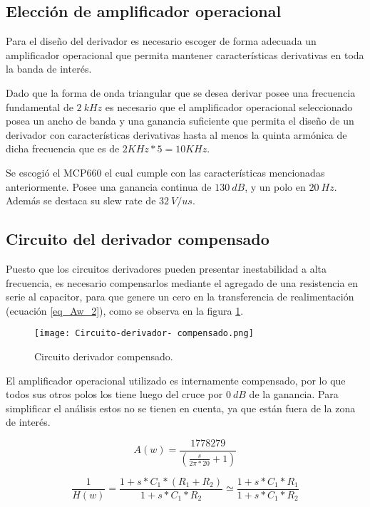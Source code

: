 \subsection{Elección de amplificador operacional}

Para el diseño del derivador es necesario escoger de forma adecuada un amplificador operacional que permita mantener características derivativas en toda la banda de interés.

Dado que la forma de onda triangular que se desea derivar posee una frecuencia fundamental de $2 \:kHz$ es necesario que el amplificador operacional seleccionado posea un ancho de banda y una ganancia suficiente que permita el diseño de un derivador con características derivativas hasta al menos la quinta armónica de dicha frecuencia que es de $2KHz*5=10 KHz$.

Se escogió el MCP660 el cual cumple con las características mencionadas anteriormente. Posee una ganancia continua de $130\:dB$, y un polo en $20\:Hz$. Además se destaca su slew rate de $32\:V/us$.

\subsection{Circuito del derivador compensado}

Puesto que los circuitos derivadores pueden presentar inestabilidad a alta frecuencia, es necesario compensarlos mediante el agregado de una resistencia en serie al capacitor, para que genere un cero en la transferencia de realimentación (ecuación \ref{eq_Aw_2}), como se observa en la figura  \ref{fig:img_Circuito_derivador_compensado}.

\begin{figure}[H]
	\centering
	\texttt{[image: Circuito-derivador- compensado.png]}
	\caption{Circuito derivador compensado.}
	\label{fig:img_Circuito_derivador_compensado}
\end{figure}

El amplificador operacional utilizado es internamente compensado, por lo que todos sus otros polos los tiene luego del cruce por $0\:dB$ de la ganancia. Para simplificar el análisis estos no se tienen en cuenta, ya que están fuera de la zona de interés.

\begin{equation} \label{eq_Aw_1}
	A(w)=\frac{1778279}{(\frac{s}{2\pi *20}+1)}
\end{equation} 

\begin{equation} \label{eq_Aw_2}
	\frac{1}{H(w)}=\frac{1+s*C_1*(R_1+R_2)}{1+s*C_1*R_2}\simeq \frac{1+s*C_1*R_1}{1+s*C_1*R_2}
\end{equation}

